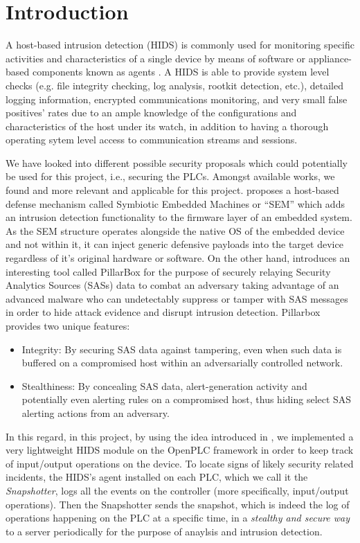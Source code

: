 
\section{Introduction}

A host-based intrusion detection (HIDS) is commonly used for monitoring specific activities and characteristics of a single device by means of software or appliance-based components known as agents \cite{ids}. A HIDS is able to provide system level checks (e.g. file integrity checking, log analysis, rootkit detection, etc.), detailed logging information, encrypted communications monitoring, and very small false positives' rates due to an ample knowledge of the configurations and characteristics of the host under its watch, in addition to having a thorough operating sytem level access to communication streams and sessions. 

We have looked into different possible security proposals which could potentially be used for this project, i.e., securing the PLCs. Amongst available works, we found \cite{simbiote} and \cite{pillarbox} more relevant and applicable for this project. \cite{simbiote} proposes a host-based defense mechanism called Symbiotic Embedded
Machines or ``SEM'' which adds an intrusion detection functionality to the firmware layer of an embedded system.  As the SEM structure
operates alongside the native OS of the embedded device and not within it, it can
inject generic defensive payloads into the target device regardless of it's original
hardware or software. On the other hand, \cite{pillarbox} introduces an interesting tool called PillarBox for the purpose of securely relaying Security Analytics Sources (SASs) data to combat an adversary taking advantage of an advanced malware who can undetectably
suppress or tamper with SAS messages in order to hide attack evidence and disrupt intrusion detection. Pillarbox provides two unique features: 
\begin{itemize}
	\item Integrity: By securing SAS data against tampering, even when such data is buffered on a compromised host within an adversarially controlled network.
	\item Stealthiness: By concealing SAS data, alert-generation activity and potentially even alerting rules on a compromised
	host, thus hiding select SAS alerting actions from an adversary.
\end{itemize}

 In this regard, in this project, by using the idea introduced in \cite{pillarbox},  we implemented a very lightweight HIDS module on the OpenPLC framework in order to keep track of input/output operations on the device. To locate signs of likely security related incidents, the HIDS's agent installed on each PLC, which we call it the \emph{Snapshotter}, logs all the events on the controller (more specifically, input/output operations). Then the Snapshotter sends the snapshot, which is indeed the log of operations happening on the PLC at a specific time,  in a \emph{stealthy and secure way} to a server periodically for the purpose of anaylsis and intrusion detection. 
 
